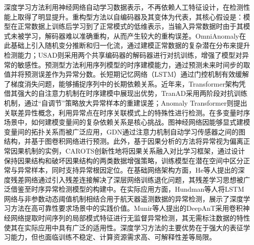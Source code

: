 深度学习方法利用神经网络自动学习数据表示，不再依赖人工特征设计，在检测性能上取得了明显提升\cite{choi2021deepreview,pang2021deepsurvey}。重构型方法以自编码器及其变体为代表，其核心假设是：模型在正常数据上训练后学习到了正常模式的低维表示，当输入异常数据时由于其模式未被学习，解码器难以准确重构，从而产生较大的重构误差。OmniAnomaly\cite{su2019omni}在此基础上引入随机变分推断和归一化流，通过建模正常数据的复杂潜在分布来提升检测能力；USAD\cite{audibert2020usad}则采用两个共享编码器的解码器进行对抗训练，增强了模型对异常的敏感性。预测型方法利用序列模型的时序建模能力，通过预测未来时间步的取值并将预测误差作为异常分数。长短期记忆网络（LSTM）\cite{hochreiter1997lstm}通过门控机制有效缓解了梯度消失问题，能够捕捉序列中的长期依赖关系。近年来，Transformer架构凭借其强大的自注意力机制在时序建模中展现出优势，TranAD\cite{tuli2022tranad}采用两阶段对抗训练机制，通过``自调节''策略放大异常样本的重建误差；Anomaly Transformer\cite{xu2022anomaly}则提出关联差异性概念，利用异常点在时序关联模式上的特殊性进行检测。在多变量时序场景中，如何建模变量间的复杂依赖关系是核心挑战。图神经网络因能够显式建模变量间的拓扑关系而被广泛应用，GDN\cite{deng2021graph}通过注意力机制自动学习传感器之间的图结构，并基于图卷积网络进行预测。此外，基于因果分析的方法将异常视为偏离正常因果机制的实例，CAROTS\cite{chen2025carots}创新性地将因果关系融入对比学习框架，通过设计保持因果结构和破坏因果结构的两类数据增强策略，训练模型在潜在空间中区分正常与异常样本，同时支持异常根因定位。在基础网络架构方面，He等人\cite{he2016resnet}提出的深度残差网络通过引入残差连接解决了深层网络训练退化问题，其残差学习思想被广泛借鉴至时序异常检测模型的构建中。在实际应用方面，Hundman等人\cite{hundman2018lstm}将LSTM网络与非参数动态阈值机制相结合用于航天器遥测数据的异常检测，展示了深度学习方法在高可靠性要求场景中的实践价值。Munir等人\cite{munir2018deepant}提出的DeepAnT采用卷积神经网络提取时间序列的局部模式特征进行无监督异常检测，其无需标注数据的特性使其在实际应用中具有广泛的适用性。深度学习方法的主要优势在于强大的表征学习能力，但也面临训练不稳定、计算资源需求高、可解释性差等局限。

